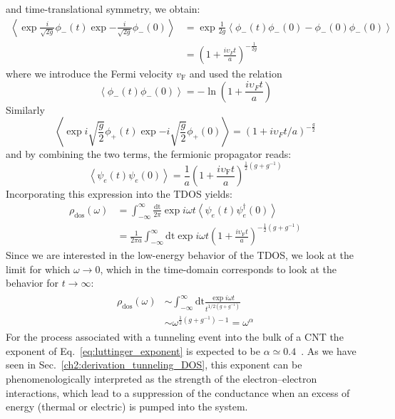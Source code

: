 %
and time-translational symmetry, we obtain:
%
\begin{align*}
    \left\langle \exp{\frac{i}{\sqrt{2g}} \phi_{-}(t)} \exp{-\frac{i}{\sqrt{2g}} \phi_{-}(0)}\right\rangle
     & = \exp{\frac{1}{2g}\left\langle \phi_{-}(t)\phi_{-}(0)-\phi_{-}(0) \phi_{-}(0)\right\rangle} \\
     & = \left(1+\frac{i\upsilon_{F}t}{a} \right)^{-\frac{1}{2 g}}
\end{align*}
%
where we introduce the Fermi velocity $v_\textrm{F}$ and used the relation
\begin{equation}
    \left\langle\phi_{-}(t)\phi_{-}(0)\right\rangle = -\ln(1+\frac{i\upsilon_{F}t}{a})
\end{equation}
%
Similarly
\begin{equation}
    \left\langle \exp{i\sqrt{\frac{g}{2}} \phi_{+}(t)} \exp{-i\sqrt{\frac{g}{2}}\phi_{+}(0)}\right\rangle = (1+i\upsilon_{F}t/a)^{-\frac{g}{2}}
\end{equation}
%
and by combining the two terms, the fermionic propagator reads:
\begin{equation}
    \left\langle\psi_{e}(t)\psi_{e}(0)\right\rangle = \frac{1}{a}(1+\frac{i\upsilon_\textrm{F}t}{a})^{\frac{1}{2}(g+g^{-1})}
\end{equation}
%
Incorporating this expression into the TDOS yields:
%
\begin{equation}
    \begin{aligned}
        \rho_{\operatorname{dos}}(\omega) & =\int_{-\infty}^{\infty} \frac{\textrm{dt}}{2 \pi} \exp{i \omega t}\left\langle\psi_{e}(t) \psi_{e}^{\dagger}(0)\right\rangle                             \\
                                          & =\frac{1}{2 \pi a} \int_{-\infty}^{\infty} \textrm{dt} \exp{i \omega t}\left(1+\frac{i\upsilon_\textrm{F}t}{a}\right)^{-\frac{1}{2}\left(g+g^{-1}\right)}
    \end{aligned}
\end{equation}
%
Since we are interested in the low-energy behavior of the TDOS, we look at the limit for which $\omega\rightarrow0$, which in the time-domain corresponds to look at the behavior for $t\rightarrow\infty$:
%
\begin{align}\label{eq:luttinger_exponent}
    \begin{split}
        \rho_{\operatorname{dos}}(\omega) & \sim \int_{-\infty}^{\infty}\textrm{dt} \frac{\exp{i\omega t }}{t^{1/2(g+g^{-1})}} \\
        & \sim \omega^{\frac{1}{2}(g + g^{-1})-1}= \omega^{\alpha}
    \end{split}
\end{align}
%
For the process associated with a tunneling event into the bulk of a \gls{CNT} the exponent of Eq.~\ref{eq:luttinger_exponent} is expected to be $\alpha\simeq 0.4$~\cite{kane1997coulomb}. As we have seen in Sec.~\ref{ch2:derivation_tunneling_DOS}, this exponent can be phenomenologically interpreted as the strength of the electron--electron interactions, which lead to a suppression of the conductance when an excess of energy (thermal or electric) is pumped into the system.

